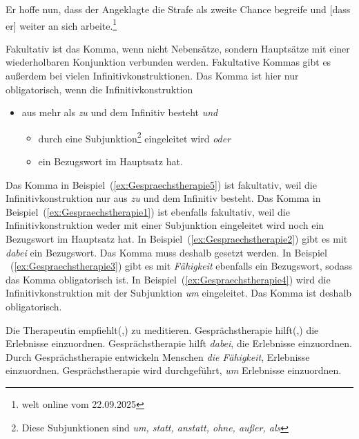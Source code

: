 \ea Er hoffe nun, dass der Angeklagte die Strafe als zweite Chance begreife und [dass er] weiter an sich arbeite.\label{ex:KommaSatzgrenze4}\footnote{welt online vom 22.09.2025}
\z


Fakultativ ist das Komma, wenn nicht Nebensätze, sondern Hauptsätze mit einer wiederholbaren Konjunktion verbunden werden. Fakultative Kommas gibt es außerdem bei vielen Infinitivkonstruktionen. Das Komma ist hier nur obligatorisch, wenn die Infinitivkonstruktion
\begin{itemize}
\item aus mehr als \textit{zu} und dem Infinitiv besteht \textit{und}
\begin{itemize}
\item durch eine Subjunktion\footnote{Diese Subjunktionen sind \textit{um, statt, anstatt, ohne, außer, als}} eingeleitet wird \textit{oder}
\item ein Bezugswort im Hauptsatz hat.
\end{itemize}
\end{itemize}

Das Komma in Beispiel~(\ref{ex:Gespraechstherapie5}) ist fakultativ, weil die Infinitivkonstruktion nur aus \textit{zu} und dem Infinitiv besteht. Das Komma in Beispiel~(\ref{ex:Gespraechstherapie1}) ist ebenfalls fakultativ, weil die Infinitivkonstruktion weder mit einer Subjunktion eingeleitet wird noch ein Bezugswort im Hauptsatz hat. In Beispiel~(\ref{ex:Gespraechstherapie2}) gibt es mit \textit{dabei} ein Bezugswort. Das Komma muss deshalb gesetzt werden. In Beispiel ~(\ref{ex:Gespraechstherapie3}) gibt es mit \textit{Fähigkeit} ebenfalls ein Bezugswort, sodass das Komma obligatorisch ist. In Beispiel~(\ref{ex:Gespraechstherapie4}) wird die Infinitivkonstruktion mit der Subjunktion \textit{um} eingeleitet. Das Komma ist deshalb obligatorisch.

\ea
\ea Die Therapeutin empfiehlt(,) zu meditieren.\label{ex:Gespraechstherapie5}
\ex Gesprächstherapie hilft(,) die Erlebnisse einzuordnen.\label{ex:Gespraechstherapie1}
\ex Gesprächstherapie hilft \textit{dabei}, die Erlebnisse einzuordnen.\label{ex:Gespraechstherapie2}
\ex Durch Gesprächstherapie entwickeln Menschen \textit{die Fähigkeit}, Erlebnisse einzuordnen.\label{ex:Gespraechstherapie3}
\ex Gesprächstherapie wird durchgeführt, \textit{um} Erlebnisse einzuordnen.\label{ex:Gespraechstherapie4}

\z
\z


